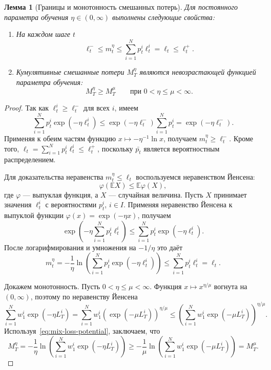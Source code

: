 \documentclass[a4paper,12pt]{article}
\theoremstyle{plain}
\newtheorem*{lemma}{Лемма}
\theoremstyle{definition}
\theoremstyle{remark}
\numberwithin{equation}{section}
\begin{document}
\begin{lemma}[Границы и монотонность смешанных потерь]
Для постоянного параметра обучения $\eta \in (0,\infty)$ выполнены следующие свойства:
\begin{enumerate}
  \item На каждом шаге $t$
  \begin{equation}
  \label{eq:mix-loss-bounds}
  \ell_t^- \leqslant m_t^\eta
  \leqslant \sum_{i=1}^{N}p_t^i\ell_t^i
  = \ell_t \leqslant \ell_t^+.
  \end{equation}
  \item Кумулятивные смешанные потери $M_T^\eta$ являются невозрастающей функцией параметра обучения:
  \begin{equation}
  \label{eq:mix-loss-monotonicity}
  M_T^\eta \geqslant M_T^\mu
  \qquad \text{при } 0 < \eta \leqslant \mu < \infty.
  \end{equation}
\end{enumerate}
\end{lemma}

\begin{proof}
Так как $\ell_t^i \geqslant \ell_t^-$ для всех $i$, имеем
\[
\sum_{i=1}^{N}p_t^i\exp\left(-\eta\ell_t^i\right)
\leqslant \exp\left(-\eta\ell_t^-\right)
\sum_{i=1}^{N}p_t^i
= \exp\left(-\eta\ell_t^-\right).
\]
Применяя к обеим частям функцию $x\mapsto -\eta^{-1}\ln x$, получаем $m_t^\eta \geqslant \ell_t^-$. Кроме того, $\ell_t = \sum_{i=1}^{N}p_t^i\ell_t^i \leqslant \ell_t^+$, поскольку $\bar{p_t}$ является вероятностным распределением.

Для доказательства неравенства $m_t^\eta \leqslant \ell_t$ воспользуемся неравенством Йенсена:
\[
\varphi(\mathbb{E}X) \leqslant \mathbb{E}\varphi(X),
\]
где $\varphi$ --- выпуклая функция, а $X$ --- случайная величина. Пусть $X$ принимает значения $\ell_t^i$ с вероятностями $p_t^i$, $i\in I$. Применяя неравенство Йенсена к выпуклой функции $\varphi(x)=\exp(-\eta x)$, получаем
\[
\exp\left(-\eta\sum_{i=1}^{N}p_t^i\ell_t^i\right)
\leqslant \sum_{i=1}^{N}p_t^i\exp\left(-\eta\ell_t^i\right).
\]
После логарифмирования и умножения на $-1/\eta$ это даёт
\[
m_t^\eta
= -\frac{1}{\eta}\ln\left(
    \sum_{i=1}^{N}p_t^i\exp\left(-\eta\ell_t^i\right)
  \right)
\leqslant \sum_{i=1}^{N}p_t^i\ell_t^i = \ell_t.
\]

Докажем монотонность. Пусть $0<\eta\leqslant\mu<\infty$. Функция $x\mapsto x^{\eta/\mu}$ вогнута на $(0,\infty)$, поэтому по неравенству Йенсена
\[
\sum_{i=1}^{N}w_1^i\exp\left(-\eta L_T^i\right)
= \sum_{i=1}^{N}w_1^i
   \left(\exp\left(-\mu L_T^i\right)\right)^{\eta/\mu}
\leqslant
\left(\sum_{i=1}^{N}w_1^i\exp\left(-\mu L_T^i\right)\right)^{\eta/\mu}.
\]
Используя~\eqref{eq:mix-loss-potential}, заключаем, что
\[
M_T^\eta
= -\frac{1}{\eta}\ln\left(
    \sum_{i=1}^{N}w_1^i\exp\left(-\eta L_T^i\right)
  \right)
\geqslant -\frac{1}{\mu}\ln\left(
    \sum_{i=1}^{N}w_1^i\exp\left(-\mu L_T^i\right)
  \right)
 = M_T^\mu.
\]
\end{proof}
\end{document}
